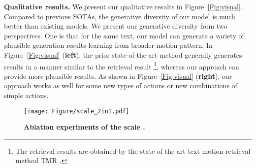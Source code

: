 \documentclass[letterpaper]{article} \usepackage{aaai24}
\begin{document}
\noindent\textbf{Qualitative results.} We present our qualitative results in Figure~\ref{Fig:visual}. Compared to previous SOTAs, the generative diversity of our model is much better than existing models. We present our generative diversity from two perspectives. One is that for the same text, our model can generate a variety of plausible generation results learning from broader motion pattern. In Figure~\ref{Fig:visual} (\textbf{left}), the prior state-of-the-art method generally generates results in a manner similar to the retrieval result \footnote{The retrieval results are obtained by the state-of-the-art text-motion retrieval method TMR \cite{petrovich23tmr}.}, whereas our approach can provide more plausible results. As shown in Figure~\ref{Fig:visual} (\textbf{right}), our approach works as well for some new types of actions or new combinations of simple actions.





\begin{figure}[tb] 
	\centering 
        
	\texttt{[image: Figure/scale\_2in1.pdf]} 
	\caption{\textbf{Ablation experiments of the scale .}} 
	\label{fig:scale} 
\end{figure} 

\begin{table}[t]
\centering
\small




\caption{\textbf{Ablation of HSA module.} MM-Dist-L and Top-1-L denote evaluation results on text no less than 12 words.}
\label{Table 4}
\end{table}
\end{document}
